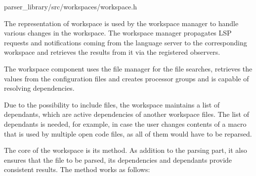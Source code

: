 
{parser\_library/src/workspaces/workspace.h}

The representation of workspace is used by the workspace manager to handle various changes in the workspace. The workspace manager propagates LSP requests and notifications coming from the language server to the corresponding workspace and retrieves the results from it via the registered observers.

The workspace component uses the file manager for the file searches, retrieves the values from the configuration files and creates processor groups and is capable of resolving dependencies.

Due to the possibility to include files, the workspace maintains a list of dependants, which are  active dependencies of another workspace files. The list of dependants is needed, for example, in case the user changes contents of a macro that is used by multiple open code files, as all of them would have to be reparsed.

The core of the workspace is its  method. As addition to the parsing part, it also ensures that the file to be parsed, its dependencies and dependants provide consistent results. The method works as follows:

